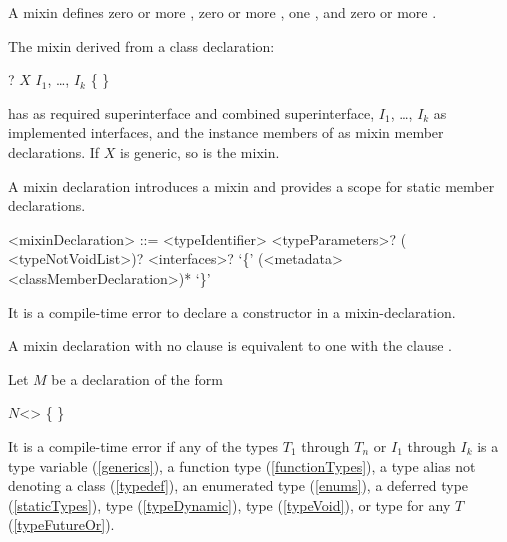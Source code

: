 \documentclass[makeidx]{article}
\begin{document}
\LMHash{}%
A mixin defines zero or more
,
zero or more
,
one
,
and zero or more
.

\LMHash{}%
The mixin derived from a class declaration:

\begin{normativeDartCode}
\ABSTRACT? \CLASS{} $X$ \IMPLEMENTS{} $I_1$, \ldots, $I_k$ \{
\}
\end{normativeDartCode}

\noindent
has  as required superinterface
and combined superinterface,
$I_1$, \ldots, $I_k$ as implemented interfaces,
and the instance members of  as mixin member declarations.
If $X$ is generic, so is the mixin.

\LMHash{}%
A mixin declaration introduces a mixin and provides a scope
for static member declarations.

\begin{grammar}
<mixinDeclaration> ::= \MIXIN{} <typeIdentifier> <typeParameters>?
  \gnewline{} (\ON{} <typeNotVoidList>)? <interfaces>?
  \gnewline{} `\{' (<metadata> <classMemberDeclaration>)* `\}'
\end{grammar}

\LMHash{}%
It is a compile-time error to declare a constructor in a mixin-declaration.

\LMHash{}%
A mixin declaration with no \code{\ON} clause is equivalent
to one with the clause .

\LMHash{}%
Let $M$ be a \MIXIN{} declaration of the form

\begin{normativeDartCode}
\MIXIN{} $N$<\TypeParametersStd> \ON{} 
    \IMPLEMENTS{}  \{
\}
\end{normativeDartCode}

\LMHash{}%
It is a compile-time error if any of the types $T_1$ through $T_n$
or $I_1$ through $I_k$ is
a type variable (\ref{generics}),
a function type (\ref{functionTypes}),
a type alias not denoting a class (\ref{typedef}),
an enumerated type (\ref{enums}),
a deferred type (\ref{staticTypes}),
type \DYNAMIC{} (\ref{typeDynamic}),
type \VOID{} (\ref{typeVoid}),
or type  for any $T$ (\ref{typeFutureOr}).
\end{document}
